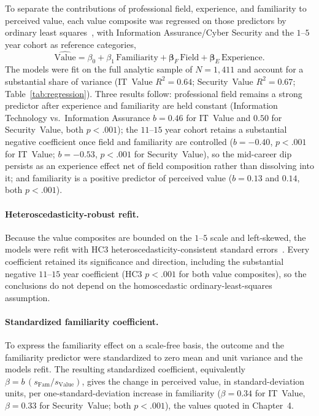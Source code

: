 To separate the contributions of professional field, experience, and familiarity to perceived value, each value composite was regressed on those predictors by ordinary least squares~\parencite{Cohen_Cohen_West_Aiken_2003}, with Information Assurance/Cyber Security and the $1$--$5$ year cohort as reference categories,
\begin{equation}
  \widehat{\text{Value}} = \beta_0 + \beta_1\,\text{Familiarity} + \bm{\beta}_F\,\text{Field} + \bm{\beta}_E\,\text{Experience}.
\end{equation}
The models were fit on the full analytic sample of $N=1{,}411$ and account for a substantial share of variance (IT~Value $R^2=0.64$; Security~Value $R^2=0.67$; Table~\ref{tab:regression}). Three results follow: professional field remains a strong predictor after experience and familiarity are held constant (Information Technology vs.\ Information Assurance $b=0.46$ for IT~Value and $0.50$ for Security~Value, both $p<.001$); the $11$--$15$ year cohort retains a substantial negative coefficient once field and familiarity are controlled ($b=-0.40$, $p<.001$ for IT~Value; $b=-0.53$, $p<.001$ for Security~Value), so the mid-career dip persists as an experience effect net of field composition rather than dissolving into it; and familiarity is a positive predictor of perceived value ($b=0.13$ and $0.14$, both $p<.001$).

\paragraph{Heteroscedasticity-robust refit.} Because the value composites are bounded on the $1$--$5$ scale and left-skewed, the models were refit with HC3 heteroscedasticity-consistent standard errors~\parencite{Long_Ervin_2000}. Every coefficient retained its significance and direction, including the substantial negative $11$--$15$ year coefficient (HC3 $p<.001$ for both value composites), so the conclusions do not depend on the homoscedastic ordinary-least-squares assumption.

\paragraph{Standardized familiarity coefficient.} To express the familiarity effect on a scale-free basis, the outcome and the familiarity predictor were standardized to zero mean and unit variance and the models refit. The resulting standardized coefficient, equivalently $\beta = b\,(s_{\text{Fam}}/s_{\text{Value}})$, gives the change in perceived value, in standard-deviation units, per one-standard-deviation increase in familiarity ($\beta = 0.34$ for IT~Value, $\beta = 0.33$ for Security~Value; both $p<.001$), the values quoted in Chapter~4.

